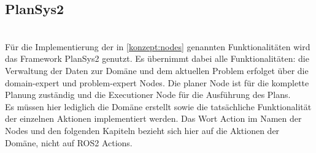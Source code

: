 \subsection{PlanSys2}
\cite{plansys}\\
Für die Implementierung der in \ref{konzept:nodes} genannten Funktionalitäten wird das Framework \ac{PlanSys2} genutzt. Es übernimmt dabei alle Funktionalitäten: die Verwaltung der Daten zur Domäne und dem aktuellen Problem erfolget über die domain-expert und problem-expert Nodes. Die planer Node ist für die komplette Planung zuständig und die Executioner Node für die Ausführung des Plans.\\
Es müssen hier lediglich die Domäne erstellt sowie die tatsächliche Funktionalität der einzelnen Aktionen implementiert werden. Das Wort Action im Namen der Nodes und den folgenden Kapiteln bezieht sich hier auf die Aktionen der Domäne, nicht auf \ac{ROS2} Actions.



